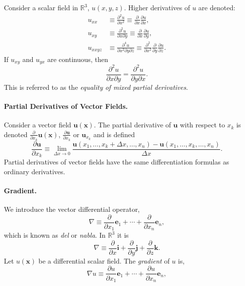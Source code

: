 Consider a scalar field in $\mathbb{R}^3$, $u(x, y, z)$.
Higher derivatives of $u$ are denoted:
\begin{align*}
  u_{x x} &\equiv \frac{\partial^2 u}{\partial x^2} \equiv \frac{\partial}{\partial x} \frac{\partial u}{\partial x}, \\
  u_{x y} &\equiv \frac{\partial^2 u}{\partial x \partial y} \equiv \frac{\partial}{\partial x} 
  \frac{\partial u}{\partial y}, \\
  u_{x x y z} &\equiv \frac{\partial^4 u}{\partial x^2 \partial y \partial z} \equiv \frac{\partial^2}{\partial x^2} 
  \frac{\partial}{\partial y} \frac{\partial u}{\partial z}.
\end{align*}
If $u_{x y}$ and $u_{y x}$ are continuous, then
\[
\frac{\partial^2 u}{\partial x \partial y} = \frac{\partial^2 u}{\partial y \partial x}.
\]
This is referred to as the \textit{equality of mixed partial derivatives}.






\paragraph{Partial Derivatives of Vector Fields.}
Consider a vector field $\mathbf{u}(\mathbf{x})$.  
The partial derivative of $\mathbf{u}$ with respect to $x_k$ 
is denoted $\frac{\partial}{\partial x_k} \mathbf{u}(\mathbf{x})$, $\frac{\partial \mathbf{u}}{\partial x_k}$ 
or $\mathbf{u}_{x_k}$ and is defined
\[
\frac{\partial \mathbf{u}}{\partial x_k} \equiv \lim_{\Delta x \to 0}
\frac{\mathbf{u}(x_1, \ldots, x_k + \Delta x, \ldots, x_n) 
  - \mathbf{u}(x_1, \ldots, x_k, \ldots, x_n)}{\Delta x}.
\]
Partial derivatives of vector fields have the 
same differentiation formulas as ordinary derivatives.  








\paragraph{Gradient.}
We introduce the vector differential operator,
\[
\nabla \equiv \frac{\partial}{\partial x_1} \mathbf{e}_1 + \cdots
+ \frac{\partial}{\partial x_n} \mathbf{e}_n,
\]
which is known as \textit{del} or \textit{nabla}.
In $\mathbb{R}^3$ it is
\[
\nabla \equiv \frac{\partial}{\partial x} \mathbf{i} + \frac{\partial}{\partial y} \mathbf{j}
+ \frac{\partial}{\partial z} \mathbf{k}.
\]
Let $u(\mathbf{x})$ be a differential scalar field.  The \textit{gradient}
of $u$ is,
\[
\nabla u \equiv \frac{\partial u}{\partial x_1} \mathbf{e}_1 + \cdots
+ \frac{\partial u}{\partial x_n} \mathbf{e}_n,
\]






